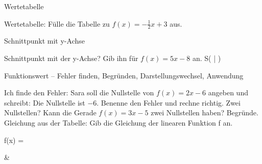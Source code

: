 \begin{aufgabe}{Wertetabelle}
\begin{teile}
\teil Wertetabelle: Fülle die Tabelle zu $f(x) = -\frac{1}{2}x + 3$ aus.

\end{teile}
\end{aufgabe}

\begin{aufgabe}{Schnittpunkt mit y-Achse}
\begin{teile}
\teil Schnittpunkt mit der y-Achse? Gib ihn für $f(x) = 5x - 8$ an. S( \leerfeld | \leerfeld )
\end{teile}
\end{aufgabe}

\begin{aufgabe}{Funktionswert – Fehler finden, Begründen, Darstellungswechsel, Anwendung}
\begin{teile}
\teil Ich finde den Fehler: Sara soll die Nullstelle von $f(x) = 2x - 6$ angeben und schreibt: Die Nullstelle ist $-6$. Benenne den Fehler und rechne richtig.
\teil Zwei Nullstellen? Kann die Gerade $f(x) = 3x - 5$ zwei Nullstellen haben? Begründe.
\teil Gleichung aus der Tabelle: Gib die Gleichung der linearen Funktion f an.

f(x) = \leerfeld
\end{teile}
\begin{gleichungsraster}[2]
 & \\
\end{gleichungsraster}
\end{aufgabe}
